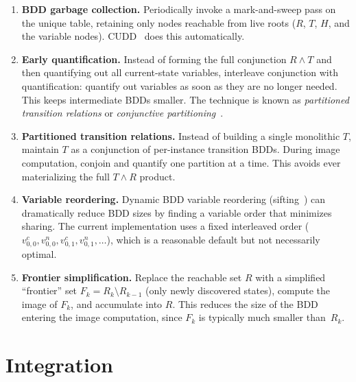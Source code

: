 \documentclass[11pt]{article}
\begin{document}
\begin{enumerate}
\item \textbf{BDD garbage collection.}  Periodically invoke a
      mark-and-sweep pass on the unique table, retaining only nodes
      reachable from live roots ($R$, $T$, $H$, and the variable
      nodes).  CUDD~\cite{Somenzi98} does this automatically.

\item \textbf{Early quantification.}  Instead of forming the full
      conjunction $R \wedge T$ and then quantifying out all
      current-state variables, interleave conjunction with
      quantification: quantify out variables as soon as they are no
      longer needed.  This keeps intermediate BDDs smaller.
      The technique is known as \emph{partitioned transition
      relations} or \emph{conjunctive partitioning}~\cite{BurchClarke91}.

\item \textbf{Partitioned transition relations.}  Instead of building
      a single monolithic $T$, maintain $T$ as a conjunction of
      per-instance transition BDDs.  During image computation, conjoin
      and quantify one partition at a time.  This avoids ever
      materializing the full $T \wedge R$ product.

\item \textbf{Variable reordering.}  Dynamic BDD variable reordering
      (sifting~\cite{Rudell93}) can dramatically reduce BDD sizes by
      finding a variable order that minimizes sharing.  The current
      implementation uses a fixed interleaved order
      ($v^c_{0,0}, v^n_{0,0}, v^c_{0,1}, v^n_{0,1}, \ldots$),
      which is a reasonable default but not necessarily optimal.

\item \textbf{Frontier simplification.}  Replace the reachable set $R$
      with a simplified ``frontier'' set $F_k = R_k \setminus R_{k-1}$
      (only newly discovered states), compute the image of $F_k$, and
      accumulate into $R$.  This reduces the size of the BDD entering
      the image computation, since $F_k$ is typically much smaller
      than~$R_k$.
\end{enumerate}

\section{Integration}
\end{document}
